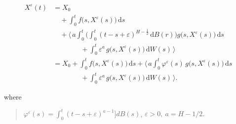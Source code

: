 \documentclass[12pt,a4paper]{report}
\numberwithin{equation}{section}
\begin{document}
\begin{equation}\tag{5.1.10}\label{eq:5.1.10}
\begin{aligned}
X^{\varepsilon}(t)
&= X_{0} \\[2pt]
&\quad + \int_{0}^{t} f\bigl(s,X^{\varepsilon}(s)\bigr)\,\mathrm{d}s \\[2pt]
&\quad + \Biggl\langle\,
a\int_{0}^{t}\Biggl(\int_{0}^{t}(t-s+\varepsilon)^{H-\frac12}\,\mathrm{d}B(r)\Biggr)
g\bigl(s,X^{\varepsilon}(s)\bigr)\,\mathrm{d}s \\[2pt]
&\qquad\qquad + \int_{0}^{t}\varepsilon^{a}\,g\bigl(s,X^{\varepsilon}(s)\bigr)\,\mathrm{d}W(s)
\,\Biggr\rangle \\[4pt]
&= X_{0}
+ \int_{0}^{t} f\bigl(s,X^{\varepsilon}(s)\bigr)\,\mathrm{d}s
+ \Biggl\langle\,
a\int_{0}^{t}\varphi^{\varepsilon}(s)\,g\bigl(s,X^{\varepsilon}(s)\bigr)\,\mathrm{d}s \\[2pt]
&\qquad\qquad + \int_{0}^{t}\varepsilon^{a}\,g\bigl(s,X^{\varepsilon}(s)\bigr)\,\mathrm{d}W(s)
\,\Biggr\rangle .
\end{aligned}
\end{equation}



where

\begin{quote}
\(\varphi^{\varepsilon}(s) = \int_{0}^{t}{(t - s + \varepsilon)^{a - 1}\rbrack dB(s)}\),
\(\varepsilon > 0,\ a = H - 1/2.\ \ \) 
\end{quote}
\end{document}
